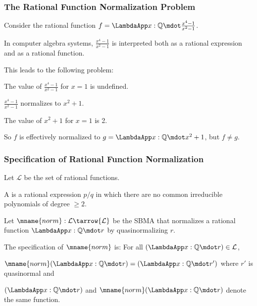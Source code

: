 \documentclass[t,12pt,numbers,fleqn]{beamer}
\newcommand{\QQ}{\ensuremath{\mathbb{Q}}}
\newcommand{\funQ}[1]{\ensuremath{\LambdaApp x : \QQ \mdot #1}}
\newcommand{\Lang}{\ensuremath{\mathcal{L}}}
\begin{document}

\begin{frame}
\frametitle{The Rational Function Normalization Problem} 
\bi

  \item Consider the rational function $f =
    \funQ{\frac{x^4-1}{x^2-1}}$.

  \item In computer algebra systems, $\frac{x^4-1}{x^2-1}$ is
    interpreted both as a rational expression and as a rational
    function.

  \item This leads to the following problem:

  \bi

    \item The value of $\frac{x^4-1}{x^2-1}$ for $x = 1$ is undefined.

    \item $\frac{x^4-1}{x^2-1}$ normalizes to $x^2 +1$.

    \item The value of $x^2 +1$ for $x = 1$ is 2.

    \item So $f$ is effectively normalized to $g = \funQ{x^2+1}$, but
      $f \not= g$.

  \ei

  \item {}

\ei
\end{frame}


\begin{frame}
\frametitle{Specification of Rational Function Normalization}
\bi

  \item Let {\Lang} be the set of rational functions.

  \item A  is a rational expression $p/q$ in
    which there are no common irreducible polynomials of degree $\ge
    2$.

  \item Let $\mname{norm} : {\Lang} \tarrow {\Lang}$ be the SBMA that
    normalizes a rational function $\funQ{r}$ by quasinormalizing $r$.

  \item The specification of $\mname{norm}$ is: For all $(\funQ{r}) \in
    \Lang$, 

  \be

    \item $\mname{norm}(\funQ{r}) = (\funQ{r'})$ where $r'$ is
      quasinormal and

    \item $(\funQ{r})$ and $\mname{norm}(\funQ{r})$ denote the same
      function.

  \ee

\ei
\end{frame}
\end{document}
